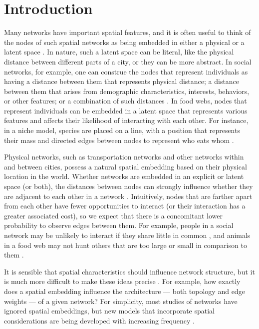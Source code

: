 \documentclass[%
 reprint,
 amsmath,amssymb,
 aps,
]{revtex4-1}
\begin{document}


\section{Introduction} \label{sec:introduction}

Many networks have important spatial features, and it is often useful to think of the nodes of such spatial networks as being embedded in either a physical or a latent space \cite{barthelemy,newman2018}. In nature, such a latent space can be literal, like the physical distance between different parts of a city, or they can be more abstract. In social networks, for example, one can construe the nodes that represent individuals as having a distance between them that represents physical distance; a distance between them that arises from demographic characteristics, interests, behaviors, or other features; or a combination of such distances \cite{social}. In food webs, nodes that represent individuals can be embedded in a latent 
space that represents various
 features and affects their likelihood of interacting with each other. 
For instance, in a niche model, species are placed on a line, with a position that represents their mass and directed edges between nodes to represent who eats whom \cite{foodwebs}.
 
Physical networks, such as transportation networks and other networks within and between cities, possess a natural spatial embedding based on their physical location in the world. Whether networks are embedded in an explicit or latent space (or both), the distances between nodes can strongly influence whether they are adjacent to each other in a network \cite{spatial1, air-traffic, routelengthstatistic}. Intuitively, nodes that are farther apart from each other have fewer opportunities to interact (or their interaction has a greater associated cost), so we expect that there is a concomitant lower probability to observe edges between them. For example, people in a social network may be unlikely to interact if they share little in common \cite{socialdistance}, and animals in a food web may not hunt others that are too large or small in comparison to them \cite{foodwebs}. 

It is sensible that spatial characteristics should influence network structure, but it is much more difficult to make these ideas precise \cite{barthelemy}. For example, how exactly does a spatial embedding influence the architecture --- both topology and edge weights --- of a given network? For simplicity, most studies of networks have ignored spatial embeddings, but new models that incorporate spatial considerations are being developed with increasing frequency \cite{barthelemy}. 
\end{document}
